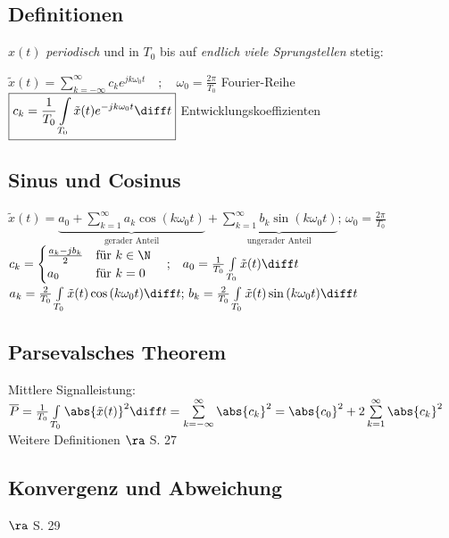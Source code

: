 \documentclass[6pt,a4paper]{scrartcl}
\begin{document}
\begin{multicols}{4}
		\subsection*{Definitionen}
		$x(t)$ \emph{periodisch} und in $T_0$ bis auf \emph{endlich viele Sprungstellen} stetig:
		
		$\boxed{
			\tilde{x}(t) = \sum\limits_{k = -\infty}^{\infty}{c_k e^{j k \omega_0 t}}\quad ;\quad \omega_0 = \frac{2\pi}{T_0}
		}$ \hfill Fourier-Reihe\\
		$\boxed{
			c_k = \frac{1}{T_0}\int\limits_{T_0}{\tilde{x}(t) e^{-j k \omega_0 t} \diff t}
		}$ \hfill Entwicklungskoeffizienten
		
		\subsection*{Sinus und Cosinus}
		$\boxed{
			\tilde{x}(t) = \underbrace{a_0 + \sum\limits_{k = 1}^{\infty}{a_k \cos{(k \omega_0 t)}}}_{\text{gerader Anteil}} + \underbrace{\sum\limits_{k = 1}^{\infty}{b_k \sin{(k \omega_0 t)}}}_{\text{ungerader Anteil}} \text{; } \omega_0 = \frac{2 \pi}{T_0}
		}$\\
		$c_k = \begin{cases}
			\frac{a_k - j b_k}{2} & \text{für } k \in \N \\
			a_0 & \text{für } k = 0\\
		\end{cases} \quad \text{;} \quad a_0 = \frac{1}{T_0}\int\limits_{T_0}{\tilde{x}(t) \diff t}$\\
		$a_k = \frac{2}{T_0}\int\limits_{T_0}{\tilde{x}(t) \cos{(k \omega_0 t)} \diff t} \text{; } b_k = \frac{2}{T_0}\int\limits_{T_0}{\tilde{x}(t) \sin{(k \omega_0 t)} \diff t}$
		
		\subsection*{Parsevalsches Theorem}
		Mittlere Signalleistung:\\
		$\overline{P} = \frac{1}{T_0}\int\limits_{T_0}{\abs{\tilde{x}(t)}^2 \diff t} = \sum\limits_{k = -\infty}^{\infty}{\abs{c_k}^2} = \abs{c_0}^2 + 2 \sum\limits_{k = 1}^{\infty}{\abs{c_k}^2}$\\
		Weitere Definitionen $\ra$ S. 27
		
		\subsection*{Konvergenz und Abweichung}
		$\ra$ S. 29
		

\end{multicols}
\end{document}
